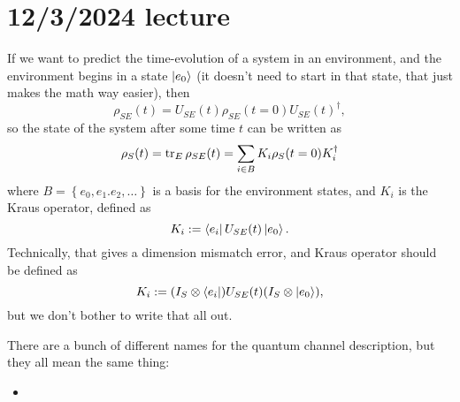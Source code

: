 \documentclass{article}
\begin{document}
\section{12/3/2024 lecture}
If we want to predict the time-evolution of a system in an environment, and the environment begins in a state $\left\lvert e_0 \right\rangle$ (it doesn't need to start in that state, that just makes the math way easier), then
\[ \rho_{SE}(t) = U_{SE}(t) \rho_{SE}(t=0) U_{SE}(t)^\dag, \]
so the state of the system after some time $t$ can be written as
\[ \rho_S(t) = \operatorname{tr}_E \rho_{SE}(t) = \sum_{i \in B} K_i \rho_S(t=0) K_i^\dag \]
where $B = \left\{ e_0, e_1. e_2, \dots \right\}$ is a basis for the environment states, and $K_i$ is the Kraus operator, defined as
\[ K_i := \left\langle e_i \right\rvert U_{SE}(t) \left\lvert e_0 \right\rangle. \]
Technically, that gives a dimension mismatch error, and Kraus operator should be defined as
\[ K_i := (I_S \otimes \left\langle e_i \right\rvert) U_{SE}(t) (I_S \otimes \left\lvert e_0 \right\rangle), \]
but we don't bother to write that all out.
\begin{note}
    There are a bunch of different names for the quantum channel description, but they all mean the same thing:
    \begin{itemize}
        \item
    \end{itemize}
\end{note}
\end{document}
